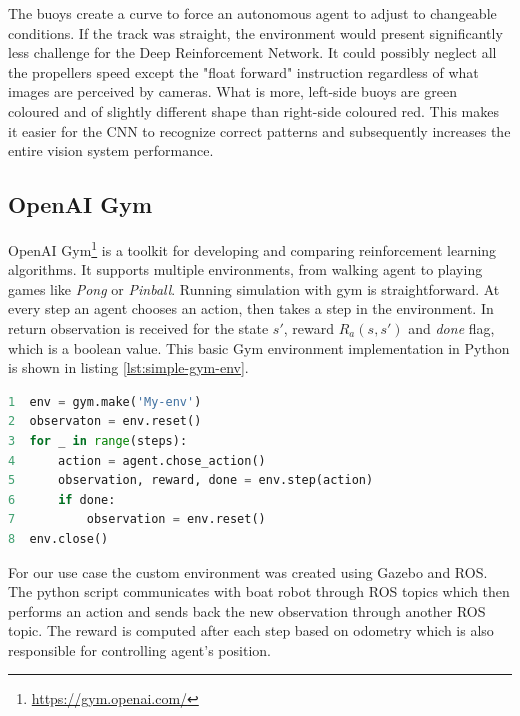 The buoys create a curve to force an autonomous agent to adjust to changeable conditions. If the track was straight, the environment would present significantly less challenge for the Deep Reinforcement Network. It could possibly neglect all the propellers speed except the "float forward" instruction regardless of what images are perceived by cameras. What is more, left-side buoys are green coloured and of slightly different shape than right-side coloured red. This makes it easier for the CNN to recognize correct patterns and subsequently increases the entire vision system performance.

\newpage

\subsection{OpenAI Gym}
\label{sub:openai-gym}

OpenAI Gym\footnote{\url{https://gym.openai.com/}} is a toolkit for developing and comparing reinforcement learning algorithms. It supports multiple environments, from walking agent to playing games like \emph{Pong} or \emph{Pinball}. Running simulation with gym is straightforward. At every step an agent chooses an action, then takes a step in the environment. In return observation is received for the state $s'$, reward $R_a(s, s')$ and \emph{done} flag, which is a boolean value. This basic
Gym environment implementation in Python is shown in listing \ref{lst:simple-gym-env}.

\begin{lstlisting}[language=Python, caption={Example gym environment simulation}, label={lst:simple-gym-env}]
1  env = gym.make('My-env')
2  observaton = env.reset()
3  for _ in range(steps):
4      action = agent.chose_action()
5      observation, reward, done = env.step(action)
6      if done:
7          observation = env.reset()
8  env.close()
\end{lstlisting}

For our use case the custom environment was created using Gazebo and ROS. The python script communicates with boat robot through ROS topics which then performs an action and sends back the new observation through another ROS topic. The reward is computed after each step based on odometry which is also responsible for controlling agent's position.

